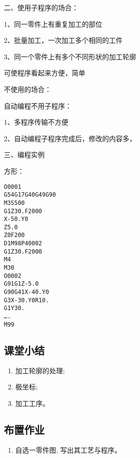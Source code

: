 二、使用子程序的场合：

1、同一零件上有重复加工的部位

2、批量加工，一次加工多个相同的工件

3、同一个零件上有多个不同形状的加工轮廓

可使程序看起来方便，简单

不使用的场合：

自动编程不用子程序：


1、多程序传输不方便

2、自动编程子程序完成后，修改的内容多，

三、编程实例

方形：

\begin{lstlisting}
O0001
G54G17G40G49G90
M3S500
G1Z30.F2000
X-50.Y0
Z5.0
Z0F200
D1M98P40002
G1Z30.F2000
M4
M30
O0002
G91G1Z-5.0
G90G41X-40.Y0
G3X-30.Y0R10.
G1Y30.
….
M99
\end{lstlisting}

\subsection{课堂小结}
\begin{enumerate}[1、]
	\item 加工轮廓的处理;
	\item 极坐标;
	\item 加工工序。
\end{enumerate}

\vfill
\subsection{布置作业}
\begin{enumerate}[1、]
	\item 自选一零件图, 写出其工艺与程序。 
\end{enumerate}
\vfill